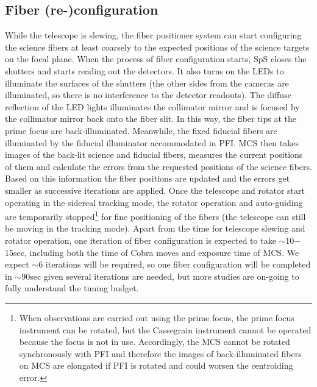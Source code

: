 \documentclass[a4paper]{article}
\begin{document}
\subsection{Fiber (re-)configuration\label{sec:detail_ope_plan:fiber_configuration}}
\label{subsec:fiber-reconfig}
While the telescope is slewing, the fiber positioner system can start
configuring the science fibers at least coarsely to the expected
positions of the science targets on the focal plane. When the process
of fiber configuration starts, SpS closes the shutters and starts
reading out the detectors. It also turns on the LEDs to illuminate the
surfaces of the shutters (the other sides from the cameras are
illuminated, so there is no interference to the detector
readouts). The diffuse reflection of the LED lights illuminates the
collimator mirror and is focused by the collimator mirror back onto
the fiber slit. In this way, the fiber tips at the prime focus are
back-illuminated. Meanwhile, the fixed fiducial fibers are illuminated
by the fiducial illuminator accommodated in PFI. MCS then takes images
of the back-lit science and fiducial fibers, measures the current
positions of them and calculate the errors from the requested
positions of the science fibers. Based on this information the fiber
positions are updated and the errors get smaller as successive
iterations are applied. Once the telescope and rotator start operating
in the sidereal tracking mode, the rotator operation and auto-guiding
are temporarily stopped\footnote{When observations are carried out
  using the prime focus, the prime focus instrument can be rotated,
  but the Cassegrain instrument cannot be operated because the focus
  is not in use. Accordingly, the MCS cannot be rotated synchronously
  with PFI and therefore the images of back-illuminated fibers on MCS
  are elongated if PFI is rotated and could worsen the centroiding
  error.}  for fine positioning of the fibers (the telescope can still
be moving in the tracking mode).
%
Apart from the time for telescope slewing and rotator operation, one
iteration of fiber configuration is expected to take $\sim$10$-$15sec,
including both the time of Cobra moves and exposure time of MCS. We
expect $\sim$6 iterations will be required, so one fiber
configuration will be completed in $\sim$90sec given several
iterations are needed, but more studies are on-going to fully
understand the timing budget.
\end{document}
